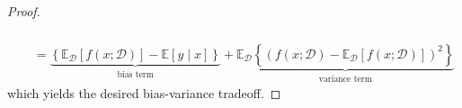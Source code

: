 \documentclass[10pt]{article} %
\begin{document}
\begin{proof}
\begin{equation}
\begin{split}
\begin{multlined}
            \end{multlined} \\
            & = \underbrace{\left\{ \mathbb{E}_{\mathcal{D}}[f(x;\mathcal{D})] - \mathbb{E}[y\mid x] \right\}}_{\text{bias term}} + \underbrace{\mathbb{E}_{\mathcal{D}} \left\{(f(x;\mathcal{D})- \mathbb{E}_{\mathcal{D}}[f(x;\mathcal{D})])^{2}\right\}}_{\text{variance term}}
        \end{split}
    \end{equation}
    which yields the desired bias-variance tradeoff. 
\end{proof}
\end{document}
